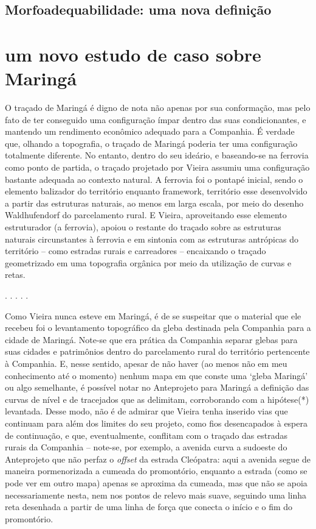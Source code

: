 \documentclass[12pt, a4paper]{book} %
\begin{document}
            \section{Morfoadequabilidade: uma nova definição} %

        \chapter[Maringá: um novo estudo de caso]{um novo estudo de caso sobre Maringá}

        O traçado de Maringá é digno de nota não apenas por sua conformação, mas pelo fato de ter conseguido uma configuração ímpar dentro das suas condicionantes, e mantendo um rendimento econômico adequado para a Companhia. É verdade que, olhando a topografia, o traçado de Maringá poderia ter uma configuração totalmente diferente. No entanto, dentro do seu ideário, e baseando-se na ferrovia como ponto de partida, o traçado projetado por Vieira assumiu uma configuração bastante adequada ao contexto natural. A ferrovia foi o pontapé inicial, sendo o elemento balizador do território enquanto framework, território esse desenvolvido a partir das estruturas naturais, ao menos em larga escala, por meio do desenho Waldhufendorf do parcelamento rural. E Vieira, aproveitando esse elemento estruturador (a ferrovia), apoiou o restante do traçado sobre as estruturas naturais circunstantes à ferrovia e em sintonia com as estruturas antrópicas do território – como estradas rurais e carreadores – encaixando o traçado geometrizado em uma topografia orgânica por meio da utilização de curvas e retas.

        \begin{center}
        . . . . .
        \end{center} 

        Como Vieira nunca esteve em Maringá, é de se suspeitar que o material que ele recebeu foi o levantamento topográfico da gleba destinada pela Companhia para a cidade de Maringá. Note-se que era prática da Companhia separar glebas para suas cidades e patrimônios dentro do parcelamento rural do território pertencente à Companhia. E, nesse sentido, apesar de não haver (ao menos não em meu conhecimento até o momento) nenhum mapa em que conste uma `gleba Maringá' ou algo semelhante, é possível notar no Anteprojeto para Maringá a definição das curvas de nível e de tracejados que as delimitam, corroborando com a hipótese(*) levantada. Desse modo, não é de admirar que Vieira tenha inserido vias que continuam para além dos limites do seu projeto, como fios desencapados à espera de continuação, e que, eventualmente, conflitam com o traçado das estradas rurais da Companhia – note-se, por exemplo, a avenida curva a sudoeste do Anteprojeto que não perfaz o \textit{offset} da estrada Cleópatra: aqui a avenida segue de maneira pormenorizada a cumeada do promontório, enquanto a estrada (como se pode ver em outro mapa) apenas se aproxima da cumeada, mas que não se apoia necessariamente nesta, nem nos pontos de relevo mais suave, seguindo uma linha reta desenhada a partir de uma linha de força que conecta o início e o fim do promontório.
\end{document}
